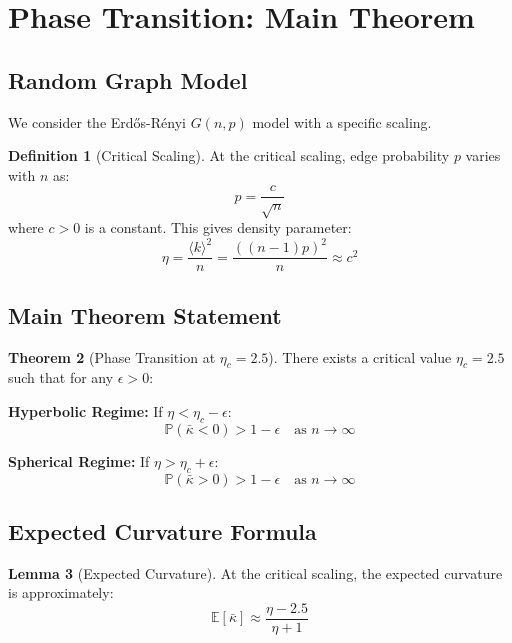 \documentclass[11pt,a4paper]{article}
\theoremstyle{definition}
\newtheorem{theorem}{Theorem}[section]
\newtheorem{lemma}[theorem]{Lemma}
\newtheorem{definition}[theorem]{Definition}
\begin{document}
\section{Phase Transition: Main Theorem}

\subsection{Random Graph Model}

We consider the Erdős-Rényi $G(n, p)$ model with a specific scaling.

\begin{definition}[Critical Scaling]
At the critical scaling, edge probability $p$ varies with $n$ as:
\begin{equation}
p = \frac{c}{\sqrt{n}}
\end{equation}
where $c > 0$ is a constant. This gives density parameter:
\begin{equation}
\eta = \frac{\langle k \rangle^2}{n} = \frac{((n-1)p)^2}{n} \approx c^2
\end{equation}
\end{definition}

\subsection{Main Theorem Statement}

\begin{theorem}[Phase Transition at $\eta_c = 2.5$]
\label{thm:phase_transition}
There exists a critical value $\eta_c = 2.5$ such that for any $\epsilon > 0$:

\textbf{Hyperbolic Regime:} If $\eta < \eta_c - \epsilon$:
\begin{equation}
\mathbb{P}(\bar{\kappa} < 0) > 1 - \epsilon \quad \text{as } n \to \infty
\end{equation}

\textbf{Spherical Regime:} If $\eta > \eta_c + \epsilon$:
\begin{equation}
\mathbb{P}(\bar{\kappa} > 0) > 1 - \epsilon \quad \text{as } n \to \infty
\end{equation}
\end{theorem}

\subsection{Expected Curvature Formula}

\begin{lemma}[Expected Curvature]
At the critical scaling, the expected curvature is approximately:
\begin{equation}
\mathbb{E}[\bar{\kappa}] \approx \frac{\eta - 2.5}{\eta + 1}
\end{equation}
\end{lemma}
\end{document}
